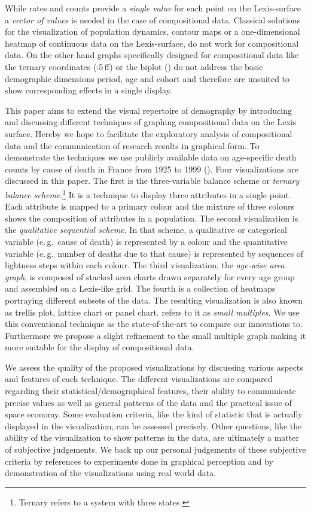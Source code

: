 \documentclass[a4paper]{scrartcl}
\begin{document}
While rates and counts provide a \emph{single value} for each point on the Lexis-surface a \emph{vector of values} is needed in the case of compositional data. Classical solutions for the visualization of population dynamics, contour maps or a one-dimensional heatmap of continuous data on the Lexis-surface, do not work for compositional data. On the other hand graphs specifically designed for compositional data like the ternary coordinates (\cite{Aitchison1986}:5\,ff) or the biplot (\cite{Gabriel1971, Aitchison2002}) do not address the basic demographic dimensions period, age and cohort and therefore are unsuited to show corresponding effects in a single display.

This paper aims to extend the visual repertoire of demography by introducing and discussing different techniques of graphing compositional data on the Lexis surface. Hereby we hope to facilitate the exploratory analysis of compositional data and the communication of research results in graphical form. To demonstrate the techniques we use publicly available data on age-specific death counts by cause of death in France from 1925 to 1999 (\cite{Vallin2014}). Four visualizations are discussed in this paper. The first is the three-variable balance scheme or \emph{ternary balance scheme}.\footnote{Ternary refers to a system with three states.} It is a technique to display three attributes in a single point. Each attribute is mapped to a primary colour and the mixture of three colours shows the composition of attributes in a population. The second visualization is the \emph{qualitative sequential scheme}. In that scheme, a qualitative or categorical variable (e.\,g.~cause of death) is represented by a colour and the quantitative variable (e.\,g.~number of deaths due to that cause) is represented by sequences of lightness steps within each colour. The third visualization, the \emph{age-wise area graph}, is composed of stacked area charts drawn separately for every age group and assembled on a Lexis-like grid. The fourth is a collection of heatmaps portraying different subsets of the data. The resulting visualization is also known as trellis plot, lattice chart or panel chart. \cite{Tufte1990} refers to it as \emph{small multiples}. We use this conventional technique as the state-of-the-art to compare our innovations to. Furthermore we propose a slight refinement to the small multiple graph making it more suitable for the display of compositional data.

We assess the quality of the proposed visualizations by discussing various aspects and features of each technique. The different visualizations are compared regarding their statistical/demographical features, their ability to communicate precise values as well as general patterns of the data and the practical issue of space economy. Some evaluation criteria, like the kind of statistic that is actually displayed in the visualization, can be assessed precisely. Other questions, like the ability of the visualization to show patterns in the data, are ultimately a matter of subjective judgements. We back up our personal judgements of these subjective criteria by references to experiments done in graphical perception and by demonstration of the visualizations using real world data.
\end{document}

